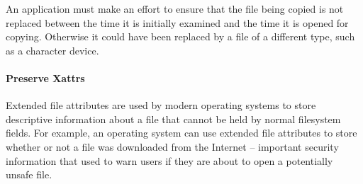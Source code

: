 An application must make an effort to ensure that the file being copied is not 
replaced between the time it is initially examined and the time it is opened 
for copying.  Otherwise it could have been replaced by a file of a different
type, such as a character device.

\paragraph{Preserve Xattrs}

Extended file attributes are used by modern
operating systems to store descriptive information about a file that cannot be
held by normal filesystem fields.  For example, an operating system can use
extended file attributes to store whether or not a file was downloaded from the
Internet -- important security information that used to warn
users if they are about to open a potentially unsafe file.  

